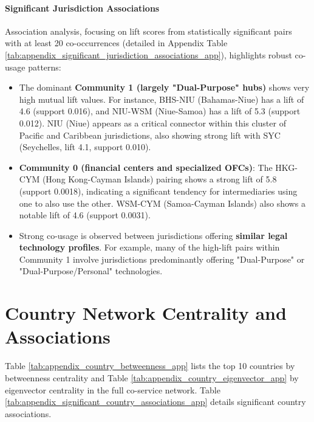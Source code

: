 \paragraph{Significant Jurisdiction Associations}
Association analysis, focusing on lift scores from statistically significant pairs with at least 20 co-occurrences (detailed in Appendix Table \ref{tab:appendix_significant_jurisdiction_associations_app}), highlights robust co-usage patterns:
\begin{itemize}
    \item The dominant \textbf{Community 1 (largely "Dual-Purpose" hubs)} shows very high mutual lift values. For instance, BHS-NIU (Bahamas-Niue) has a lift of 4.6 (support 0.016), and NIU-WSM (Niue-Samoa) has a lift of 5.3 (support 0.012). NIU (Niue) appears as a critical connector within this cluster of Pacific and Caribbean jurisdictions, also showing strong lift with SYC (Seychelles, lift 4.1, support 0.010).
    \item \textbf{Community 0 (financial centers and specialized OFCs)}: The HKG-CYM (Hong Kong-Cayman Islands) pairing shows a strong lift of 5.8 (support 0.0018), indicating a significant tendency for intermediaries using one to also use the other. WSM-CYM (Samoa-Cayman Islands) also shows a notable lift of 4.6 (support 0.0031).
    \item Strong co-usage is observed between jurisdictions offering \textbf{similar legal technology profiles}. For example, many of the high-lift pairs within Community 1 involve jurisdictions predominantly offering "Dual-Purpose" or "Dual-Purpose/Personal" technologies.
\end{itemize}


\section{Country Network Centrality and Associations}
\label{sec:appendix_country_network}

Table \ref{tab:appendix_country_betweenness_app} lists the top 10 countries by betweenness centrality and Table \ref{tab:appendix_country_eigenvector_app} by eigenvector centrality in the full co-service network. Table \ref{tab:appendix_significant_country_associations_app} details significant country associations.

